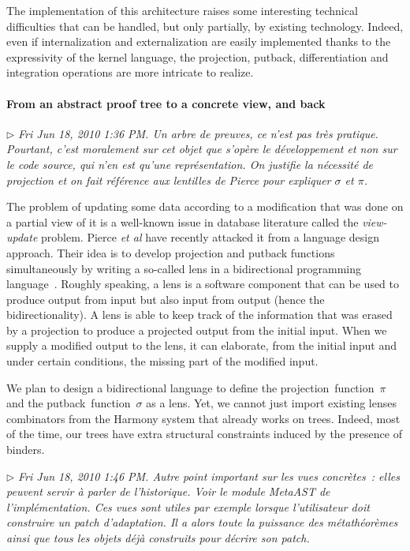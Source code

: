 \documentclass{article}
\newcommand{\remtext}[1]{\textcolor{bwgreen}{$\triangleright$ \textsl{#1}}}
\begin{document}
The implementation of this architecture raises some interesting
technical difficulties that can be handled, but only partially, 
by existing technology. Indeed, even if internalization and 
externalization are easily implemented thanks to the expressivity
of the kernel language, the projection, putback, differentiation
and integration operations are more intricate to realize. 

\paragraph{From an abstract proof tree to a concrete view, and back}
\-
\remtext{Fri Jun 18, 2010  1:36 PM. Un arbre de preuves, ce n'est
  pas très pratique. Pourtant, c'est moralement sur cet objet 
  que s'opère le développement et non sur le code source, qui
  n'en est qu'une représentation. On justifie la nécessité de
  projection et on fait référence aux lentilles de Pierce pour
  expliquer $\sigma$ et $\pi$.}

The problem of updating some data according to a modification that was
done on a partial view of it is a well-known issue in database
literature called the \textit{view-update} problem. Pierce \textit{et
  al} have recently attacked it from a language design approach. Their
idea is to develop projection and putback functions simultaneously by
writing a so-called lens in a bidirectional programming
language~\cite{pierce-bidirectional}. Roughly speaking, a lens is a
software component that can be used to produce output from input but
also input from output (hence the bidirectionality). A lens is able
to keep track of the information that was erased by a projection to
produce a projected output from the initial input. When we supply a
modified output to the lens, it can elaborate, from the initial input
and under certain conditions, the missing part of the modified input. 

We plan to design a bidirectional language to define the
projection~function~$\pi$ and the putback~function~$\sigma$ as a
lens. Yet, we cannot just import existing lenses combinators from the
Harmony system that already works on trees. Indeed, most of the time,
our trees have extra structural constraints induced by the presence of
binders. 

\remtext{Fri Jun 18, 2010 1:46 PM. Autre point important sur les vues
  concrètes~: elles peuvent servir à parler de l'historique.  Voir le
  module MetaAST de l'implémentation. Ces vues sont utiles par exemple
  lorsque l'utilisateur doit construire un patch d'adaptation. Il a
  alors toute la puissance des métathéorèmes ainsi que tous les objets
  déjà construits pour décrire son patch.}
\end{document}
